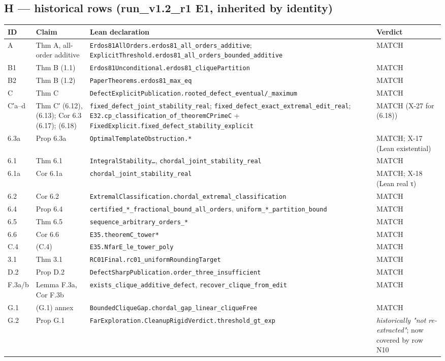 \documentclass[
]{article}
\newcounter{none} %
\begin{document}
\subsection{H --- historical rows (run\_v1.2\_r1 E1, inherited by
identity)}\label{h--historical-rows-run_v12_r1-e1-inherited-by-identity}

{\def\LTcaptype{none} %
\begin{longtable}[]{@{}llll@{}}
\toprule\noalign{}
ID & Claim & Lean declaration & Verdict \\
\midrule\noalign{}
\endhead
\bottomrule\noalign{}
\endlastfoot
A & Thm A, all-order additive &
\texttt{Erdos81AllOrders.erdos81\_all\_orders\_additive};
\texttt{ExplicitThreshold.erdos81\_all\_orders\_bounded\_additive} &
MATCH \\
B1 & Thm B (1.1) &
\texttt{Erdos81Unconditional.erdos81\_cliquePartition} & MATCH \\
B2 & Thm B (1.2) & \texttt{PaperTheorems.erdos81\_max\_eq} & MATCH \\
C & Thm C &
\texttt{DefectExplicitPublication.rooted\_defect\_eventual/\_maximum} &
MATCH \\
C′a--d & Thm C′ (6.12), (6.13); Cor 6.3 (6.17); (6.18) &
\texttt{fixed\_defect\_joint\_stability\_real};
\texttt{fixed\_defect\_exact\_extremal\_edit\_real};
\texttt{E32.cp\_classification\_of\_theoremCPrimeC} +
\texttt{FixedExplicit.fixed\_defect\_stability\_explicit} & MATCH (X-27
for (6.18)) \\
6.3a & Prop 6.3a & \texttt{OptimalTemplateObstruction.*} & MATCH; X-17
(Lean existential) \\
6.1 & Thm 6.1 & \texttt{IntegralStability…},
\texttt{chordal\_joint\_stability\_real} & MATCH \\
6.1a & Cor 6.1a & \texttt{chordal\_joint\_stability\_real} & MATCH; X-18
(Lean real τ) \\
6.2 & Cor 6.2 &
\texttt{ExtremalClassification.chordal\_extremal\_classification} &
MATCH \\
6.4 & Prop 6.4 & \texttt{certified\_*\_fractional\_bound\_all\_orders},
\texttt{uniform\_*\_partition\_bound} & MATCH \\
6.5 & Thm 6.5 & \texttt{sequence\_arbitrary\_orders\_*} & MATCH \\
6.6 & Cor 6.6 & \texttt{E35.theoremC\_tower*} & MATCH \\
C.4 & (C.4) & \texttt{E35.NfarE\_le\_tower\_poly} & MATCH \\
3.1 & Thm 3.1 & \texttt{RC01Final.rc01\_uniformRoundingTarget} &
MATCH \\
D.2 & Prop D.2 &
\texttt{DefectSharpPublication.order\_three\_insufficient} & MATCH \\
F.3a/b & Lemma F.3a, Cor F.3b &
\texttt{exists\_clique\_additive\_defect},
\texttt{recover\_clique\_from\_edit} & MATCH \\
G.1 & (G.1) annex &
\texttt{BoundedCliqueGap.chordal\_gap\_linear\_cliqueFree} & MATCH \\
G.2 & Prop G.1 &
\texttt{FarExploration.CleanupRigidVerdict.threshold\_gt\_exp} &
\emph{historically "not re-extracted"}; now covered by row N10 \\
\end{longtable}
}
\end{document}
